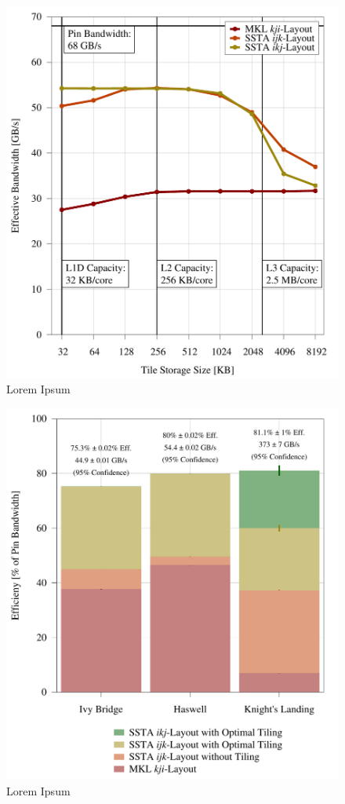 \documentclass{sig-alternate-05-2015}
\begin{document}
\begin{figure}%
    \centering
    \label{fig:r0}
    \caption{Lorem Ipsum}
    \includegraphics[width=0.95\columnwidth]{figures/post_tsb_tw_sweep_full_matrix_double_precision_production_cori_hsw_e5_2698_v3_08_31_2016_09_03_2016_16pus.pdf}
\end{figure}

\begin{figure}%
    \centering
    \label{fig:r0}
    \caption{Lorem Ipsum}
    \includegraphics[width=0.95\columnwidth]{figures/post_tsb_impact_of_optimizations_histogram_09_03_2016_09_04_2016_1socket.pdf}
\end{figure}
\end{document}
